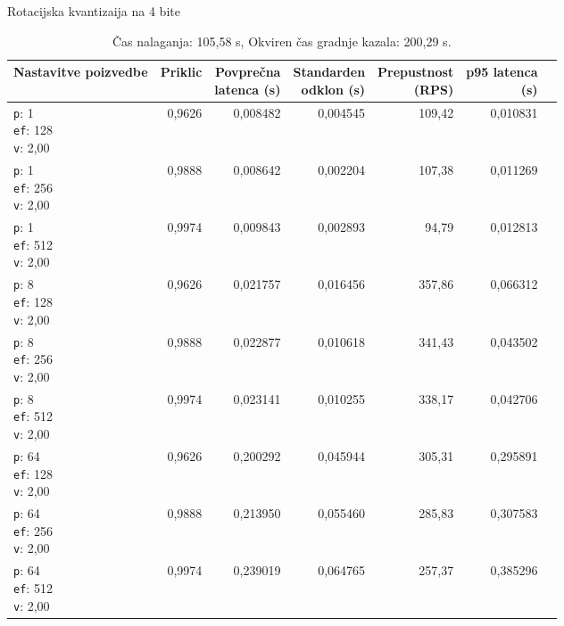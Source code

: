 \begin{table}[htbp]
  \centering
\small
  \caption{Rotacijska kvantizaija na 4 bite}
  \label{tab:single-2cpu-4ram:tq4-2:qdrant-dipl-baseline-tenant-subgraph-tq4-m16-ef-128-random-768-100-tenants-extended-upload-2026-08-18-07-52-55.json}
  \begin{tabularx}{\textwidth}{Xrrrrrr}
    \toprule
    Nastavitve poizvedbe & Priklic & \makecell{Povprečna\\latenca (s)} & \makecell{Standarden\\odklon (s)} & \makecell{Prepustnost\\(RPS)} & \makecell{p95 latenca\\(s)}  \\
    \midrule
    \makecell{\texttt{p}: 1\\\texttt{ef}: 128\\\texttt{v}: 2,00} & 0,9626 & 0,008482 & 0,004545 & 109,42 & 0,010831 \\
    \makecell{\texttt{p}: 1\\\texttt{ef}: 256\\\texttt{v}: 2,00} & 0,9888 & 0,008642 & 0,002204 & 107,38 & 0,011269 \\
    \makecell{\texttt{p}: 1\\\texttt{ef}: 512\\\texttt{v}: 2,00} & 0,9974 & 0,009843 & 0,002893 & 94,79 & 0,012813 \\
    \makecell{\texttt{p}: 8\\\texttt{ef}: 128\\\texttt{v}: 2,00} & 0,9626 & 0,021757 & 0,016456 & 357,86 & 0,066312 \\
    \makecell{\texttt{p}: 8\\\texttt{ef}: 256\\\texttt{v}: 2,00} & 0,9888 & 0,022877 & 0,010618 & 341,43 & 0,043502 \\
    \makecell{\texttt{p}: 8\\\texttt{ef}: 512\\\texttt{v}: 2,00} & 0,9974 & 0,023141 & 0,010255 & 338,17 & 0,042706 \\
    \makecell{\texttt{p}: 64\\\texttt{ef}: 128\\\texttt{v}: 2,00} & 0,9626 & 0,200292 & 0,045944 & 305,31 & 0,295891 \\
    \makecell{\texttt{p}: 64\\\texttt{ef}: 256\\\texttt{v}: 2,00} & 0,9888 & 0,213950 & 0,055460 & 285,83 & 0,307583 \\
    \makecell{\texttt{p}: 64\\\texttt{ef}: 512\\\texttt{v}: 2,00} & 0,9974 & 0,239019 & 0,064765 & 257,37 & 0,385296 \\
    \bottomrule
  \end{tabularx}
\caption* {Čas nalaganja: 105,58 s, Okviren čas gradnje kazala: 200,29 s.}\end{table}

